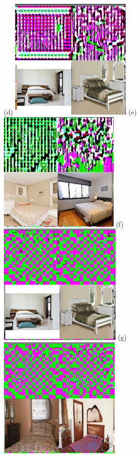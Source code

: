 \documentclass{article}
\begin{document}
        \begin{figure}[H]
          \centering
            (d)
            \includegraphics[scale=0.24]{smoothgrad/stylegan/real.png}
            (e)
            \includegraphics[scale=0.24]{smoothgrad/stylegan/stylegan.png}
            (f)
            \includegraphics[scale=0.24]{smoothgrad/coco/real.png}
            (g)
            \includegraphics[scale=0.24]{smoothgrad/coco/coco.png}

\end{figure}
\end{document}
